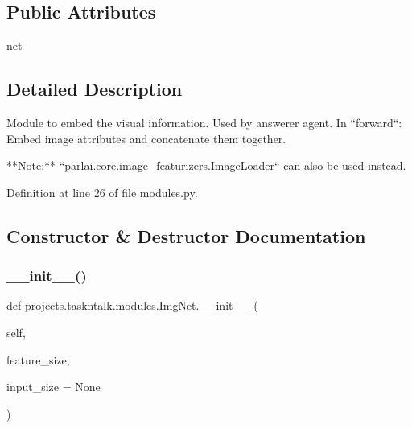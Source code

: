 \subsection*{Public Attributes}
\begin{DoxyCompactItemize}
\item 
\hyperlink{classprojects_1_1taskntalk_1_1modules_1_1ImgNet_ad2f75d9e18e4b10703db9f2ff3a988d2}{net}
\end{DoxyCompactItemize}


\subsection{Detailed Description}
\begin{DoxyVerb}Module to embed the visual information. Used by answerer agent. In ``forward``:
Embed image attributes and concatenate them together.

**Note:** ``parlai.core.image_featurizers.ImageLoader`` can also be
used instead.
\end{DoxyVerb}
 

Definition at line 26 of file modules.\+py.



\subsection{Constructor \& Destructor Documentation}
\mbox{\label{classprojects_1_1taskntalk_1_1modules_1_1ImgNet_a9723f98d54a1fa7607ed0a4dc98f4786}} 
\subsubsection{\texorpdfstring{\+\_\+\+\_\+init\+\_\+\+\_\+()}{\_\_init\_\_()}}
{\footnotesize\ttfamily def projects.\+taskntalk.\+modules.\+Img\+Net.\+\_\+\+\_\+init\+\_\+\+\_\+ (\begin{DoxyParamCaption}\item[{}]{self,  }\item[{}]{feature\+\_\+size,  }\item[{}]{input\+\_\+size = {\ttfamily None} }\end{DoxyParamCaption})}



